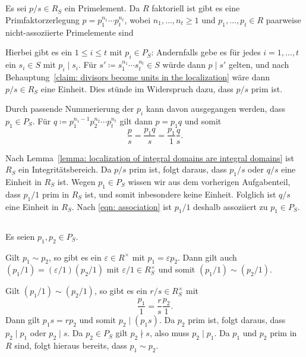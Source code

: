 \documentclass[a4paper,10pt,numbers=noenddot]{scrartcl}
\begin{document}
\subsection{}

Es sei $p/s \in R_S$ ein Primelement.
Da $R$ faktoriell ist gibt es eine Primfaktorzerlegung $p  = p_1^{n_1} \dotsm p_t^{n_t}$, wobei $n_1, \dotsc, n_t \geq 1$ und $p_1, \dotsc, p_t \in R$ paarweise nicht-assoziierte Primelemente sind

Hierbei gibt es ein $1 \leq i \leq t$ mit $p_i \in P_S$:
Andernfalls gebe es für jedes $i = 1, \dotsc, t$ ein $s_i \in S$ mit $p_i \mid s_i$.
Für $s' \coloneqq s_1^{n_1} \dotsm s_t^{n_t} \in S$ würde dann $p \mid s'$ gelten, und nach Behauptung~\ref{claim: divisors become units in the localization} wäre dann $p/s \in R_S$ eine Einheit.
Dies stünde im Widerspruch dazu, dass $p/s$ prim ist.

Durch passende Nummerierung der $p_i$ kann davon ausgegangen werden, dass $p_1 \in P_S$.
Für $q \coloneqq p_1^{n_1-1} p_2^{n_2} \dotsm p_t^{n_t}$ gilt dann $p = p_1 q$ und somit
\begin{equation}
  \label{eqn: association}
    \frac{p}{s}
  = \frac{p_1 q}{s}
  = \frac{p_1}{1} \frac{q}{s}.
\end{equation}

Nach Lemma~\ref{lemma: localization of integral domains are integral domains} ist $R_S$ ein Integritätsbereich.
Da $p/s$ prim ist, folgt daraus, dass $p_1/s$ oder $q/s$ eine Einheit in $R_S$ ist.
Wegen $p_1 \in P_S$ wissen wir aus dem vorherigen Aufgabenteil, dass $p_1/1$ prim in $R_S$ ist, und somit inbesondere keine Einheit.
Folglich ist $q/s$ eine Einheit in $R_S$.
Nach \eqref{eqn: association} ist $p_1/1$ deshalb assoziiert zu $p_1 \in P_S$.





\subsection{}

Es seien $p_1, p_2 \in P_S$.

Gilt $p_1 \sim p_2$, so gibt es ein $\varepsilon \in R^\times$ mit $p_1 = \varepsilon p_2$.
Dann gilt auch $(p_1/1) = (\varepsilon/1)(p_2/1)$ mit $\varepsilon/1 \in R_S^\times$ und somit $(p_1/1) \sim (p_2/1)$.

Gilt $(p_1/1) \sim (p_2/1)$, so gibt es ein $r/s \in R_S^\times$ mit
\[
    \frac{p_1}{1}
  = \frac{r}{s} \frac{p_2}{1}.
\]
Dann gilt $p_1 s = r p_2$ und somit $p_2 \mid (p_1 s)$.
Da $p_2$ prim ist, folgt daraus, dass $p_2 \mid p_1$ oder $p_2 \mid s$.
Da $p_2 \in P_S$ gilt $p_2 \nmid s$, also muss $p_2 \mid p_1$.
Da $p_1$ und $p_2$ prim in $R$ sind, folgt hieraus bereits, dass $p_1 \sim p_2$.
\end{document}
